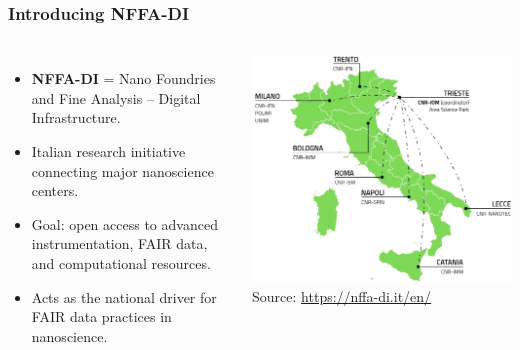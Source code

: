 \documentclass{beamer}
\begin{document}
	\begin{frame}
		\frametitle{Introducing NFFA-DI}
		\begin{columns}[T,totalwidth=\textwidth]
			\begin{itemize}
				\item \textbf{NFFA-DI} = Nano Foundries and Fine Analysis – Digital Infrastructure.
				\item Italian research initiative connecting major nanoscience centers.
				\item Goal: open access to advanced instrumentation, FAIR data, and computational resources.
				\item Acts as the national driver for FAIR data practices in nanoscience.
			\end{itemize}
			\includegraphics[width=\textwidth]{otherResources/NFFA_map.png} %
			\vspace{2em}
			\tiny Source: \url{https://nffa-di.it/en/}
		\end{columns}
	\end{frame}

	
	
\end{document}
